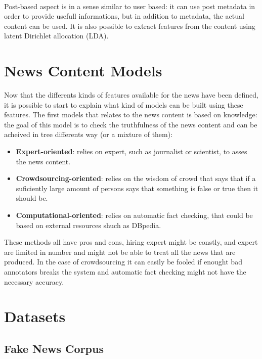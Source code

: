 \paragraph{} Post-based aspect is in a sense similar to user based: it can use post metadata in order to provide usefull informations, but in addition to metadata, the actual content can be used. It is also possible to extract features from the content using latent Dirichlet allocation (LDA)\cite{blei2003latent}.

\section{News Content Models}

Now that the differents kinds of features available for the news have been defined, it is possible to start to explain what kind of models can be built using these features. The first models that relates to the news content is based on knowledge: the goal of this model is to check the truthfulness of the news content and can be acheived in tree differents way (or a mixture of them):

\begin{itemize}
	\item \textbf{Expert-oriented}: relies on expert, such as journalist or scientist, to asses the news content.
	\item \textbf{Crowdsourcing-oriented}: relies on the wisdom of crowd that says that if a suficiently large amount of persons says that something is false or true then it should be.
	\item \textbf{Computational-oriented}: relies on automatic fact checking, that could be based on external resources shuch as DBpedia.
\end{itemize}

These methods all have pros and cons, hiring expert might be constly, and expert are limited in number and might not be able to treat all the news that are produced. In the case of crowdsourcing it can easily be fooled if enought bad annotators breaks the system and automatic fact checking might not have the necessary accuracy.

\section{Datasets}
\subsection{Fake News Corpus}
